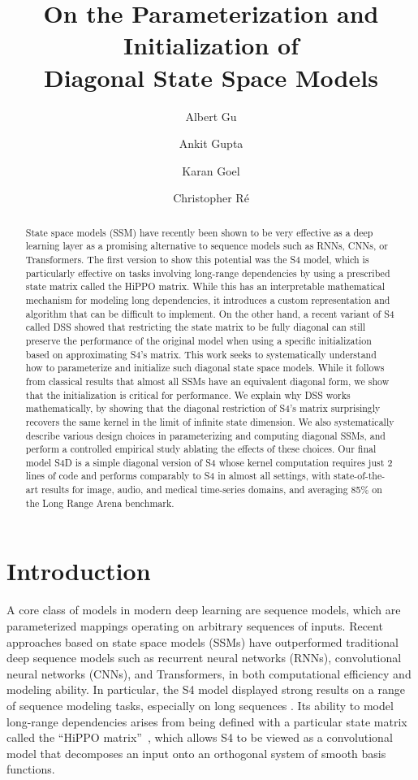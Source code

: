\documentclass{article}
\title{On the Parameterization and Initialization of \\ Diagonal State Space Models}
\author[]{Albert Gu}
\author[]{Ankit Gupta}
\author[]{Karan Goel}
\author[]{Christopher R{\'e}}
\affil[]{Department of Computer Science, Stanford University}
\affil[]{IBM Research}
\affil[]{{\texttt{\{albertgu,krng\}@stanford.edu}, \texttt{chrismre@cs.stanford.edu}}}
\date{}
\begin{document}
\maketitle


\begin{abstract}
  State space models (SSM) have recently been shown to be very effective as a deep learning layer as a promising alternative to sequence models such as RNNs, CNNs, or Transformers.
  The first version to show this potential was the S4 model, which is particularly effective on tasks involving long-range dependencies by using a prescribed state matrix called the HiPPO matrix.
  While this has an interpretable mathematical mechanism for modeling long dependencies,
  it introduces a custom representation and algorithm that can be difficult to implement.
  On the other hand, a recent variant of S4 called DSS showed that restricting the state matrix to be fully diagonal can still preserve the performance of the original model when using a specific initialization based on approximating S4's matrix.
  This work seeks to systematically understand how to parameterize and initialize such diagonal state space models.
  While it follows from classical results that almost all SSMs have an equivalent diagonal form, we show that the initialization is critical for performance.
  We explain why DSS works mathematically, by showing that the diagonal restriction of S4's matrix surprisingly recovers the same kernel in the limit of infinite state dimension.
  We also systematically describe various design choices in parameterizing and computing diagonal SSMs, and perform a controlled empirical study ablating the effects of these choices.
  Our final model S4D is a simple diagonal version of S4 whose kernel computation requires just 2 lines of code and performs comparably to S4 in almost all settings, with state-of-the-art results for image, audio, and medical time-series domains, and averaging 85\% on the Long Range Arena benchmark.
\end{abstract}
 
\section{Introduction}
\label{sec:intro}

A core class of models in modern deep learning are sequence models, which are parameterized mappings operating on arbitrary sequences of inputs. Recent approaches based on state space models (SSMs) have outperformed traditional deep sequence models such as recurrent neural networks (RNNs), convolutional neural networks (CNNs), and Transformers, in both computational efficiency and modeling ability.
In particular, the S4 model displayed strong results on a range of sequence modeling tasks, especially on long sequences \citep{gu2022efficiently}.
Its ability to model long-range dependencies arises from being defined with a particular state matrix called the ``HiPPO matrix''~\citep{gu2020hippo},
which allows S4 to be viewed as a convolutional model that decomposes an input onto an orthogonal system of smooth basis functions\citep{gu2022hippo}. 
\end{document}
